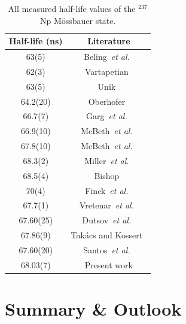 \documentclass[aps,UTF8,prc,twocolumn,preprintnumbers,amsmath,amssymb,floatfix]{revtex4-2}
\begin{document}
\begin{table}[htbp!]
\caption{\label{All_half_lives}All measured half-life values of the $^{237}$Np M\"{o}ssbauer state.}
\begin{center}
\renewcommand{\arraystretch}{1.1}
\begin{ruledtabular}
\begin{tabular}{cc}
Half-life (ns) & Literature \\
\hline
63(5) & Beling~\textit{et al.}~\cite{Beling_PR1952} \\
62(3) & Vartapetian~\cite{Vartapetian_AP1958} \\
63(5) & Unik~\cite{Unik_Thesis1960} \\
64.2(20) & Oberhofer~\cite{Oberhofer_Thesis1968} \\
66.7(7) & Garg~\textit{et al.}~\cite{Garg_ZP1971} \\
66.9(10) & McBeth~\textit{et al.}~\cite{McBeth_NIM1972} \\
67.8(10) & McBeth~\textit{et al.}~\cite{McBeth_NIM1972} \\
68.3(2) & Miller~\textit{et al.}~\cite{Miller_NIM1972} \\
68.5(4) & Bishop~\cite{Bishop_NIM1974} \\
70(4) & Finck~\textit{et al.}~\cite{Finck_NIMA1985} \\
67.7(1) & Vretenar~\textit{et al.}~\cite{Vretenar_AJP2019} \\
67.60(25) & Dutsov~\textit{et al.}~\cite{Dutsov_ARI2021} \\
67.86(9) & Tak\'{a}cs and Kossert~\cite{Takacs_ARI2021} \\
67.60(20) & Santos~\textit{et al.}~\cite{Santos_NPA2023} \\
68.03(7) & Present work \\
\end{tabular}
\end{ruledtabular}
\end{center}
\end{table}


\FloatBarrier
\section{Summary \& Outlook}
\end{document}
